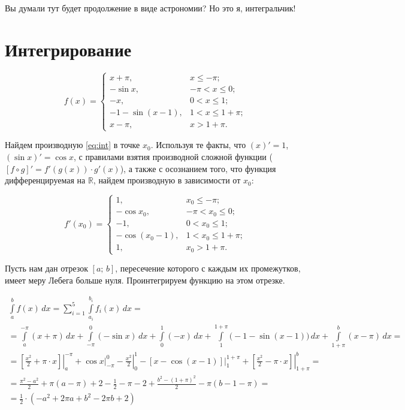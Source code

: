 \documentclass[12pt]{article}
\numberwithin{equation}{section} %
\theoremstyle{definition}\newtheorem{defi}{Определение}
\begin{document}
Вы думали тут будет продолжение в виде астрономии? Но это я, интегральчик!

\section{Интегрирование}

\begin{equation} \label{eq:int}
f(x) = \begin{cases}
  x + \pi, & x \leq -\pi;\\
  -\sin x, & -\pi < x \leq 0;\\
  -x, & 0 < x \leq 1;\\
  -1 -\sin (x - 1), & 1 < x \leq 1 + \pi;\\
  x - \pi, & x > 1 + \pi.
\end{cases}
\end{equation}

Найдем производную \eqref{eq:int} в точке $x_0$. Используя те факты, что $(x)' = 1$, $(\sin x)' = \cos x$, с правилами взятия производной сложной функции \big($[f \circ g]' = f'(g(x)) \cdot g'(x)$\big), а также с осознанием того, что функция дифференцируемая на $\mathbb{R}$, найдем производную в зависимости от $x_0$:

\begin{equation} \label{eq:int_der}
f'(x_0) = \begin{cases}
  1, & x_0 \leq -\pi;\\
  -\cos x_0, & -\pi < x_0 \leq 0;\\
  -1, & 0 < x_0 \leq 1;\\
  -\cos (x_0 - 1), & 1 < x_0 \leq 1 + \pi;\\
  1, & x_0 > 1 + \pi.
\end{cases}
\end{equation}

Пусть нам дан отрезок $[a;\,b]$, пересечение которого с каждым их промежутков, имеет меру Лебега больше нуля. Проинтегрируем функцию на этом отрезке.

\begin{multline}
  \int \limits_a^b f(x)\,dx = \sum \limits_{i = 1}^5 \int \limits_{a_i}^{b_i} f_i(x)\,dx = \\
  = \int \limits_a^{-\pi}(x + \pi)\,dx + \int \limits_{-\pi}^{0}(-\sin x)\,dx + \int \limits_0^1 (-x)\,dx + \int \limits_1^{1 + \pi} \big(-1 - \sin(x - 1) \big)\,dx + \int \limits_{1 + \pi}^b (x - \pi)\,dx = \\
  = \left.\left[\frac{x^2}{2} + \pi \cdot x \right]\right|_a^{-\pi} 
  + \left.\cos x\right|_{-\pi}^{0}
  - \left.\frac{x^2}{2} \right|_{0}^{1}
  - \left.\left[x - \cos(x - 1) \right]\right|_{1}^{1 + \pi}
  + \left.\left[\frac{x^2}{2} - \pi \cdot x \right]\right|_{1 + \pi}^{b} =\\
  = \frac{\pi^2 - a^2}{2} + \pi(a - \pi) + 2 - \frac{1}{2} - \pi - 2 + \frac{b^2 - (1 + \pi)^2}{2} - \pi(b - 1 - \pi) =\\
  = \frac{1}{2} \cdot \left( -a^2 + 2\pi a + b^2 - 2\pi b + 2 \right)
\end{multline}
\end{document}
